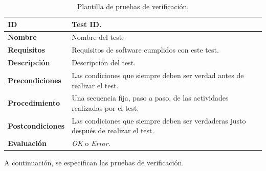 \vspace{-0.5cm}

\begin{center}
\begin{table}[htbp]
\centering
{}
\caption{Plantilla de pruebas de verificación.}
\begin{tabular}{@{}p{2.5cm} p{9cm}@{}} 
\toprule
\textbf{ID} 					& Test ID. \\
\midrule
\textbf{Nombre} 				& Nombre del test. \\
\midrule
\textbf{Requisitos} 		& Requisitos de \gls{software} cumplidos con este test. \\
\midrule
\textbf{Descripción} 		& Descripción del test. \\
\midrule
\textbf{Precondiciones}		& Las condiciones que siempre deben ser verdad antes de realizar el test. \\
\midrule
\textbf{Procedimiento}			& Una secuencia fija, paso a paso, de las actividades realizadas por el test. \\
\midrule
\textbf{Postcondiciones} 		& Las condiciones que siempre deben ser verdaderas justo después de realizar el test. \\
\midrule
\textbf{Evaluación} 			& \textit{OK} o \textit{Error}. \\
\bottomrule
\end{tabular}
\label{tab:verification_tests}
\end{table}
\end{center}

\vspace{0.1cm}

A continuación, se especifican las pruebas de verificación.

